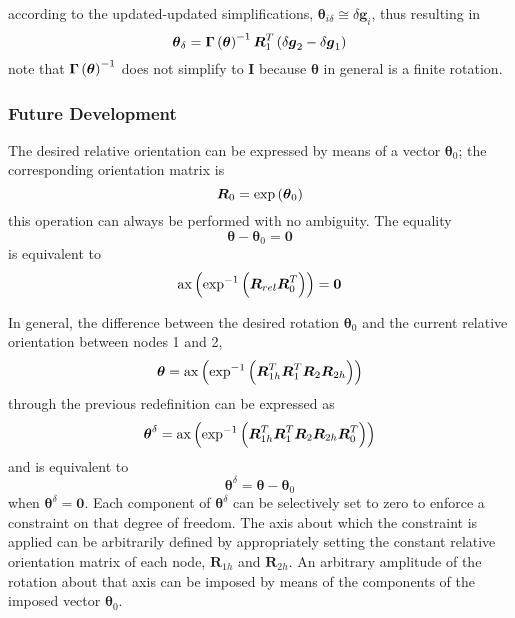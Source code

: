 \documentclass[10pt,dvips]{report}
\newcommand{\T}[1]{\boldsymbol{#1}}
\begin{document}
according to the updated-updated simplifications,
$\T{\theta}_{i\delta}\cong\delta\T{g}_i$, thus resulting in
\begin{equation}
	\T{\theta}_{\delta} = \T{\Gamma}\plbr{\T{\theta}}^{-1} \T{R}_1^T \plbr{
		\delta\T{g}_2 - \delta\T{g}_1
	}
	\label{eq:DRIVE-HINGE-theta-delta}
\end{equation}
note that $\T{\Gamma}\plbr{\T{\theta}}^{-1}$ does not simplify to $\T{I}$
because $\T{\theta}$ in general is a finite rotation.





\subsubsection{Future Development}
The desired relative orientation can be expressed by means of a vector 
$\T{\theta}_0$; the corresponding orientation matrix is
\begin{displaymath}
	\T{R}_0 = \exp\plbr{\T{\theta}_0}
\end{displaymath}
this operation can always be performed with no ambiguity.
The equality
\begin{displaymath}
	\T{\theta} - \T{\theta}_0 = \T{0}
\end{displaymath}
is equivalent to
\begin{displaymath}
	\llk{ax}\plbr{\exp^{-1}\plbr{\T{R}_{rel} \T{R}_0^T}} = \T{0}
\end{displaymath}

\noindent
In general, the difference between the desired rotation
$\T{\theta}_0$ and the current relative orientation between
nodes 1 and 2,
\begin{displaymath}
	\T{\theta} = \llk{ax}\plbr{\exp^{-1}\plbr{
		\T{R}_{1h}^T \T{R}_1^T \T{R}_2 \T{R}_{2h}
	}}
\end{displaymath}
through the previous redefinition can be expressed as
\begin{displaymath}
	\T{\theta}^{\delta} = \llk{ax}\plbr{\exp^{-1}\plbr{
		\T{R}_{1h}^T \T{R}_1^T \T{R}_2 \T{R}_{2h} \T{R}_0^T
	}}
\end{displaymath}
and is equivalent to
\begin{displaymath}
	\T{\theta}^{\delta} = \T{\theta} - \T{\theta}_0
\end{displaymath}
when $\T{\theta}^{\delta}=\T{0}$.
Each component of $\T{\theta}^{\delta}$ can be selectively set
to zero to enforce a constraint on that degree of freedom.
The axis about which the constraint is applied can be arbitrarily 
defined by appropriately setting the constant relative orientation
matrix of each node, $\T{R}_{1h}$ and $\T{R}_{2h}$.
An arbitrary amplitude of the rotation about that axis can be imposed
by means of the components of the imposed vector $\T{\theta}_0$.
\end{document}
